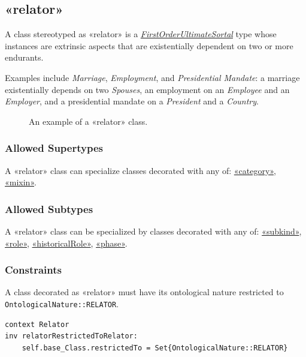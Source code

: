 \subsection{«relator»}
\label{stereotype:relator}

A class stereotyped as «relator» is a \hyperref[stereotype:firstOrderUltimateSortal]{\textit{FirstOrderUltimateSortal}} type whose instances are extrinsic aspects that are existentially dependent on two or more endurants. %


Examples include \textit{Marriage}, \textit{Employment}, and \textit{Presidential Mandate}: a marriage existentially depends on two \textit{Spouses}, an employment on an \textit{Employee} and an \textit{Employer}, and a presidential mandate on a \textit{President} and a \textit{Country}.

\begin{figure}[h]
    \centering
    
    \caption{An example of a «relator» class.}
    \label{fig:relator-example}
\end{figure}

\subsubsection{Allowed Supertypes}

A «relator» class can specialize classes decorated with any of: 
\hyperref[stereotype:category]{«category»}, \hyperref[stereotype:mixin]{«mixin»}.

\subsubsection{Allowed Subtypes}

A «relator» class can be specialized by classes decorated with any of:
\hyperref[stereotype:subkind]{«subkind»}, \hyperref[stereotype:role]{«role»}, \hyperref[stereotype:historicalRole]{«historicalRole»}, \hyperref[stereotype:phase]{«phase»}.

\subsubsection{Constraints}

\begin{constraint}
\label{relatorRestrictedToRelator}
A class decorated as «relator» must have its ontological nature restricted to \texttt{OntologicalNature::RELATOR}.

\begin{lstlisting}[language=OCL]
context Relator 
inv relatorRestrictedToRelator:
    self.base_Class.restrictedTo = Set{OntologicalNature::RELATOR}
\end{lstlisting}
\end{constraint}

